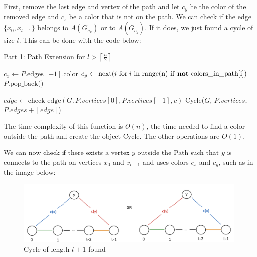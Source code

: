 First, remove the last edge and
vertex of the path and let $c_y$ be the color of the removed edge and $c_x$ 
be a color that is not on the path.
We can check if the edge $\{x_0, x_{l-1}\}$ belongs to $A(G_{c_x})$ or
to $A(G_{c_y})$. If it does, we just found a cycle of size $l$. 
This can be done with the code below:

\begin{algorithm}[H]
    \caption{Part 1: Path Extension for \( l > \left \lceil \frac{n}{2} \right \rceil \)}
    \begin{algorithmic}
            \State $c_x \gets P.\text{edges}[-1].\text{color}$ 
            \State $c_y \gets \text{next}(i \text{ for } i \text{ in range(n) if \textbf{not} colors\_in\_path[i]})$
            \State $P.\text{pop\_back()}$ 

                \State $edge \gets \text{check\_edge}(G, P.vertices[0], P.vertices[-1], c)$
                    \State \Return Cycle($G$, $P.vertices$, $P.edges + [edge]$) 
                \EndIf
            \EndFor
        \EndFunction
    \end{algorithmic}
\end{algorithm}

The time complexity of this function is $O(n)$, the time needed
to find a color outside the path and create the object Cycle. The other
operations are $O(1)$.

We can now check if there exists a vertex $y$ outside the Path
such that $y$ is connects to the path on vertices $x_0$ and $x_{l-1}$
and uses colors $c_x$ and $c_y$, such as in the image below:

\begin{figure}[H]
    \centering
    \includegraphics[width=1\textwidth]{figuras/path_vertex_outside.png}
    \caption{Cycle of length \( l + 1 \) found}
    \label{fig:path_vertex_outside}
\end{figure}


